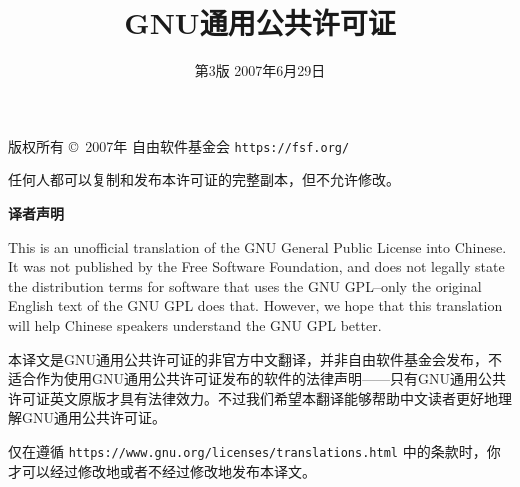 \documentclass[11pt]{article}
\title{GNU通用公共许可证}
\date{第3版 \space 2007年6月29日}
\begin{document}
\maketitle

\begin{center}
  {\parindent 0in

    版权所有 \copyright\  2007年 自由软件基金会 \texttt{https://fsf.org/}

    \bigskip
    任何人都可以复制和发布本许可证的完整副本，但不允许修改。}

\end{center}
\begin{center}
  {\bf\large 译者声明}
\end{center}

This is an unofficial translation of the GNU General Public License into Chinese. It was not published by the Free Software Foundation, and does not legally state the distribution terms for software that uses the GNU GPL--only the original English text of the GNU GPL does that. However, we hope that this translation will help Chinese speakers understand the GNU GPL better.

本译文是GNU通用公共许可证的非官方中文翻译，并非自由软件基金会发布，不适合作为使用GNU通用公共许可证发布的软件的法律声明——只有GNU通用公共许可证英文原版才具有法律效力。不过我们希望本翻译能够帮助中文读者更好地理解GNU通用公共许可证。

仅在遵循 \texttt{https://www.gnu.org/licenses/translations.html} 中的条款时，你才可以经过修改地或者不经过修改地发布本译文。

\pagebreak
\end{document}
